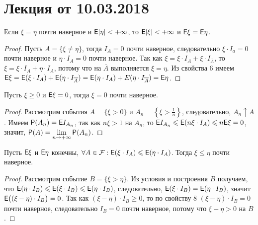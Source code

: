 \section{Лекция от 10.03.2018}
\begin{property}
	Если $\xi = \eta$ почти наверное и $\E | \eta| < +\infty$, то $\E | \xi| < +\infty$ и $\E \xi = \E \eta$.
	\begin{proof}
		Пусть $A = \{ \xi \neq \eta \}$, тогда $I_A = 0$ почти наверное, следовательно $\xi \cdot I_a = 0$ почти наверное и $\eta \cdot I_A = 0$ почти наверное. Так как $\xi = \xi \cdot I_A + \xi \cdot I_{\overline A}$, то $\xi = \xi \cdot I_A + \eta \cdot I_A$, потому что на $\overline A$ выполняется $\xi = \eta$. Из свойства 6 имеем $\E \xi = \E ( \xi \cdot I_A ) + \E (\eta \cdot I_{\overline A} ) = \E ( \eta \cdot I_A) + E ( \eta \cdot I_{\overline A} ) = \E \eta$. 
	\end{proof}
\end{property}
\begin{property}
	Пусть $\xi \geqslant 0$ и $\E \xi = 0$, тогда $\xi = 0$ почти наверное.
	\begin{proof}
		Рассмотрим события $A = \{ \xi > 0 \}$ и $A_n = \left\{ \xi > \frac{1}{n} \right\} $, следовательно, $A_n \uparrow A$. Имеем $\P (A_n) = \E I_{A_n}$, так как $n\xi > 1$ на $A_n$, то  $\E I_{A_n} \leqslant \E (n\xi \cdot I_A) \leqslant n \E \xi = 0$, значит, $\P(A) = \lim\limits_{n \rightarrow +\infty} \P (A_n)$.
	\end{proof}
\end{property}
\begin{property}
	Пусть $\E \xi$ и $\E \eta$ конечны, $\forall A \in \F: \E (\xi \cdot I_A) \leqslant \E ( \eta \cdot I_A)$. Тогда  $\xi \leqslant \eta$ почти наверное.
	\begin{proof}
		Рассмотрим событие $B = \{ \xi > \eta \}$. Из условия и построения $B$ получаем, что $\E (\eta \cdot I_B) \leqslant \E (\xi \cdot I_B) \leqslant \E (\eta \cdot I_B)$, следовательно, $\E( \xi \cdot I_B) = \E(\eta \cdot I_B)$, значит $\E \big( (\xi - \eta) \cdot I_B \big) = 0$. Так как $(\xi - \eta) \cdot I_B \geqslant 0$, то по свойству 8 $(\xi - \eta) \cdot I_B = 0$ почти наверное, следовательно $I_B = 0$ почти наверное, потому что $\xi- \eta > 0$ на $B$.
	\end{proof}
\end{property}
